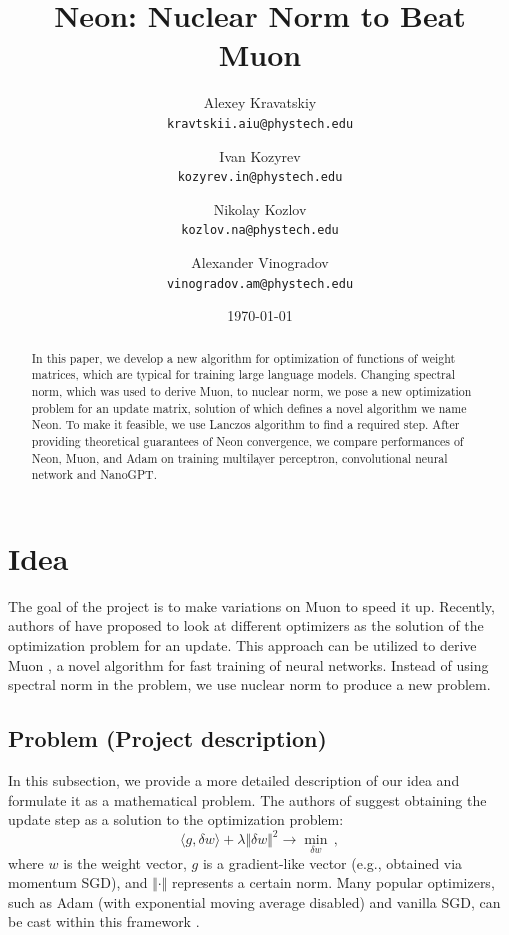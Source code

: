 \documentclass[]{scrartcl}
\title{Neon: Nuclear Norm to Beat Muon}
\author{
  Alexey Kravatskiy\\
  \texttt{kravtskii.aiu@phystech.edu}
  \and
  Ivan Kozyrev\\
  \texttt{kozyrev.in@phystech.edu}
  \and
  Nikolay Kozlov \\
  \texttt{kozlov.na@phystech.edu}
  \and
  Alexander Vinogradov \\
  \texttt{vinogradov.am@phystech.edu}
}
\date{\today}
\newcommand{\norm}[1]{\Vert{#1}\Vert}
\begin{document}
\maketitle

\begin{abstract}
In this paper, we develop a new algorithm for optimization of functions of weight matrices, which are typical for training large language models. Changing spectral norm, which was used to derive Muon, to nuclear norm, we pose a new optimization problem for an update matrix, solution of which defines a novel algorithm we name Neon. To make it feasible, we use Lanczos algorithm to find a required step. After providing theoretical guarantees of Neon convergence, we compare performances of Neon, Muon, and Adam on training multilayer perceptron, convolutional neural network and NanoGPT.

\end{abstract}

\section{Idea}
The goal of the project is to make variations on Muon to speed it up. Recently, authors of \cite{bernstein2024oldoptimizernewnorm} have proposed to look at different optimizers as the solution of the optimization problem for an update. This approach can be utilized to derive Muon \cite{jordan2024muon}, a novel algorithm for fast training of neural networks. Instead of using spectral norm in the problem, we use nuclear norm to produce a new problem. %

\subsection{Problem (Project description)}

In this subsection, we provide a more detailed description of our idea and formulate it as a mathematical problem. The authors of \cite{bernstein2024oldoptimizernewnorm} suggest obtaining the update step as a solution to the optimization problem:
\begin{equation}
    \langle g, \delta w \rangle + \lambda \norm{\delta w}^2 \to \min_{\delta w}\,,
\end{equation}
where $w$ is the weight vector, $g$ is a gradient-like vector (e.g., obtained via momentum SGD), and $\norm{\cdot}$ represents a certain norm. Many popular optimizers, such as Adam (with exponential moving average disabled) and vanilla SGD, can be cast within this framework \cite{bernstein2024oldoptimizernewnorm}.
\end{document}

